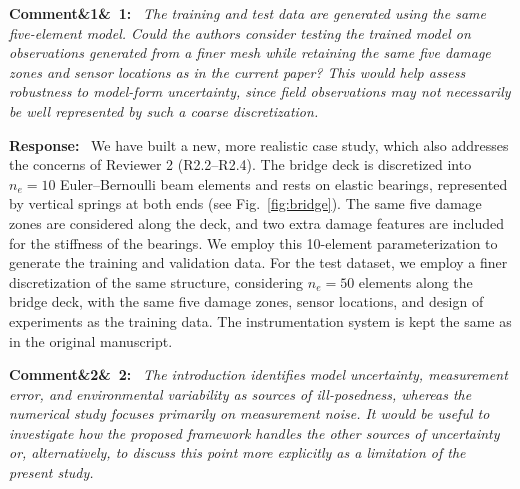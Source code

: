 \documentclass[11pt]{article}
\newenvironment{rcomment}[1]{\par\bigskip\noindent\textbf{Comment\ifx&#1&\else\ #1\fi:}\ \itshape}{\par}
\newenvironment{response}{\par\smallskip\noindent\color{resp}\textbf{Response:}\ }{\par}
\newcommand{\z}{\mathbf{z}}
\begin{document}
\begin{rcomment}{1}
The training and test data are generated using the same five-element model. Could the authors consider testing the trained model on observations generated from a finer mesh while retaining the same five damage zones and sensor locations as in the current paper? This would help assess robustness to model-form uncertainty, since field observations
may not necessarily be well represented by such a coarse discretization.
\end{rcomment}

\begin{response}
We have built a new, more realistic case study, which also addresses the concerns of Reviewer 2 (R2.2--R2.4). 
The bridge deck is discretized into $n_{e}  = 10$  Euler--Bernoulli beam elements and rests on elastic bearings, represented by vertical springs at both ends (see Fig.~\ref{fig:bridge}). 
The same five damage zones are considered along the deck, and two extra damage features are included for the stiffness of the bearings.  
We employ this 10-element parameterization to generate the training and validation data.
For the test dataset, we employ a finer discretization of the same structure, considering $n_{e} = 50$ elements along the bridge deck, with the same five damage zones, sensor locations, and design of experiments as the training data.
The instrumentation system is kept the same as in the original manuscript. 


\end{response}

\begin{rcomment}{2}
The introduction identifies model uncertainty, measurement error, and environmental variability as sources of
ill-posedness, whereas the numerical study focuses primarily on measurement noise. It would be useful to investigate how
the proposed framework handles the other sources of uncertainty or, alternatively, to discuss this point more explicitly
as a limitation of the present study.
\end{rcomment}
\end{document}
